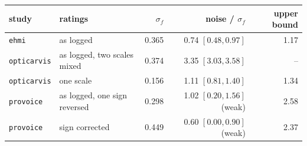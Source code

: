 \begin{tabular}{llrrr}
\toprule
study & ratings & $\sigma_f$ & noise / $\sigma_f$ & upper bound \\
\midrule
\texttt{ehmi} & as logged & 0.365 & 0.74 {\scriptsize $[0.48, 0.97]$} & 1.17 \\
\texttt{opticarvis} & as logged, two scales mixed & 0.374 & 3.35 {\scriptsize $[3.03, 3.58]$} & -- \\
\texttt{opticarvis} & one scale & 0.156 & 1.11 {\scriptsize $[0.81, 1.40]$} & 1.34 \\
\texttt{provoice} & as logged, one sign reversed & 0.298 & 1.02 {\scriptsize $[0.20, 1.56]$} (weak) & 2.58 \\
\texttt{provoice} & sign corrected & 0.449 & 0.60 {\scriptsize $[0.00, 0.90]$} (weak) & 2.37 \\
\bottomrule
\end{tabular}
